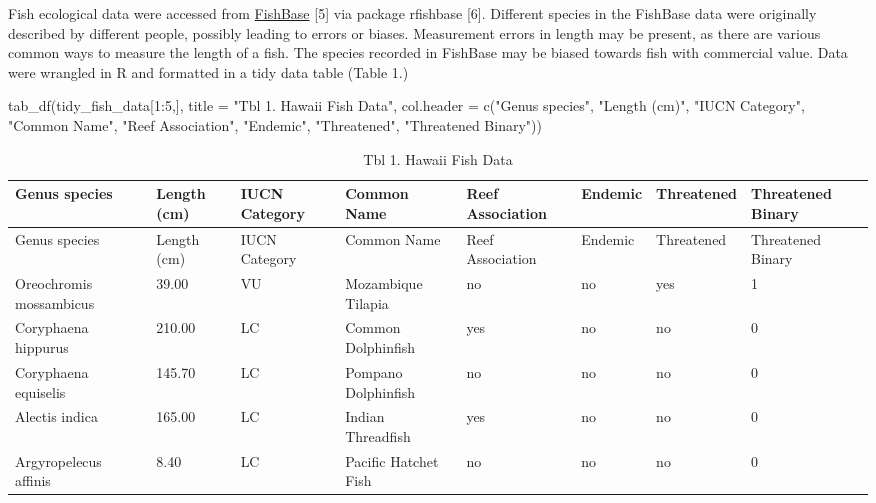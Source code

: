 \documentclass[
  letterpaper,
  DIV=11,
  numbers=noendperiod]{scrartcl}
\newenvironment{Shaded}{\begin{snugshade}}{\end{snugshade}}
\newcommand{\AttributeTok}[1]{\textcolor[rgb]{0.40,0.45,0.13}{#1}}
\newcommand{\DecValTok}[1]{\textcolor[rgb]{0.68,0.00,0.00}{#1}}
\newcommand{\FunctionTok}[1]{\textcolor[rgb]{0.28,0.35,0.67}{#1}}
\newcommand{\NormalTok}[1]{\textcolor[rgb]{0.00,0.23,0.31}{#1}}
\newcommand{\SpecialCharTok}[1]{\textcolor[rgb]{0.37,0.37,0.37}{#1}}
\newcommand{\StringTok}[1]{\textcolor[rgb]{0.13,0.47,0.30}{#1}}
\begin{document}
Fish ecological data were accessed from
\href{https://fishbase.net.br/search.php}{FishBase} {[}5{]} via package
rfishbase {[}6{]}. Different species in the FishBase data were
originally described by different people, possibly leading to errors or
biases. Measurement errors in length may be present, as there are
various common ways to measure the length of a fish. The species
recorded in FishBase may be biased towards fish with commercial value.
Data were wrangled in R and formatted in a tidy data table (Table 1.)

\begin{Shaded}
\begin{Highlighting}[]
\FunctionTok{tab\_df}\NormalTok{(tidy\_fish\_data[}\DecValTok{1}\SpecialCharTok{:}\DecValTok{5}\NormalTok{,],}
       \AttributeTok{title =} \StringTok{"Tbl 1. Hawaii Fish Data"}\NormalTok{,}
       \AttributeTok{col.header =} \FunctionTok{c}\NormalTok{(}\StringTok{"Genus species"}\NormalTok{, }\StringTok{"Length (cm)"}\NormalTok{, }\StringTok{"IUCN Category"}\NormalTok{, }
                          \StringTok{"Common Name"}\NormalTok{, }\StringTok{"Reef Association"}\NormalTok{, }\StringTok{"Endemic"}\NormalTok{,}
                          \StringTok{"Threatened"}\NormalTok{, }\StringTok{"Threatened Binary"}\NormalTok{))}
\end{Highlighting}
\end{Shaded}

\begin{longtable}[]{@{}llllllll@{}}
\caption{Tbl 1. Hawaii Fish Data}\tabularnewline
\toprule()
Genus species & Length (cm) & IUCN Category & Common Name & Reef
Association & Endemic & Threatened & Threatened Binary \\
\midrule()
\endfirsthead
\toprule()
Genus species & Length (cm) & IUCN Category & Common Name & Reef
Association & Endemic & Threatened & Threatened Binary \\
\midrule()
\endhead
Oreochromis mossambicus & 39.00 & VU & Mozambique Tilapia & no & no &
yes & 1 \\
Coryphaena hippurus & 210.00 & LC & Common Dolphinfish & yes & no & no &
0 \\
Coryphaena equiselis & 145.70 & LC & Pompano Dolphinfish & no & no & no
& 0 \\
Alectis indica & 165.00 & LC & Indian Threadfish & yes & no & no & 0 \\
Argyropelecus affinis & 8.40 & LC & Pacific Hatchet Fish & no & no & no
& 0 \\
\bottomrule()
\end{longtable}
\end{document}
